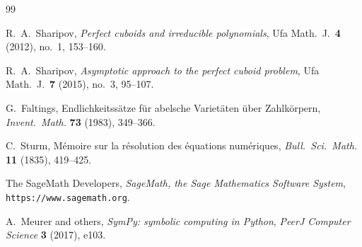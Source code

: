 \documentclass[12pt]{article}
\theoremstyle{remark}
\theoremstyle{definition}
\begin{document}
\begingroup
\footnotesize
\begin{thebibliography}{99}

R.~A.~Sharipov,
\newblock \emph{Perfect cuboids and irreducible polynomials},
\newblock Ufa Math.\ J.\ \textbf{4} (2012), no.~1, 153--160.

R.~A.~Sharipov,
\newblock \emph{Asymptotic approach to the perfect cuboid problem},
\newblock Ufa Math.\ J.\ \textbf{7} (2015), no.~3, 95--107.

G.~Faltings,
\newblock Endlichkeitss{\"a}tze f{\"u}r abelsche Variet{\"a}ten {\"u}ber Zahlk{\"o}rpern,
\newblock \emph{Invent.\ Math.} \textbf{73} (1983), 349--366.

C.~Sturm,
\newblock M{\'e}moire sur la r{\'e}solution des {\'e}quations num{\'e}riques,
\newblock \emph{Bull.\ Sci.\ Math.} \textbf{11} (1835), 419--425.

The SageMath Developers,
\newblock \emph{SageMath, the Sage Mathematics Software System},
\newblock \texttt{https://www.sagemath.org}.

A.~Meurer and others,
\newblock \emph{SymPy: symbolic computing in Python},
\newblock \emph{PeerJ Computer Science} \textbf{3} (2017), e103.

\end{thebibliography}
\endgroup
\end{document}

